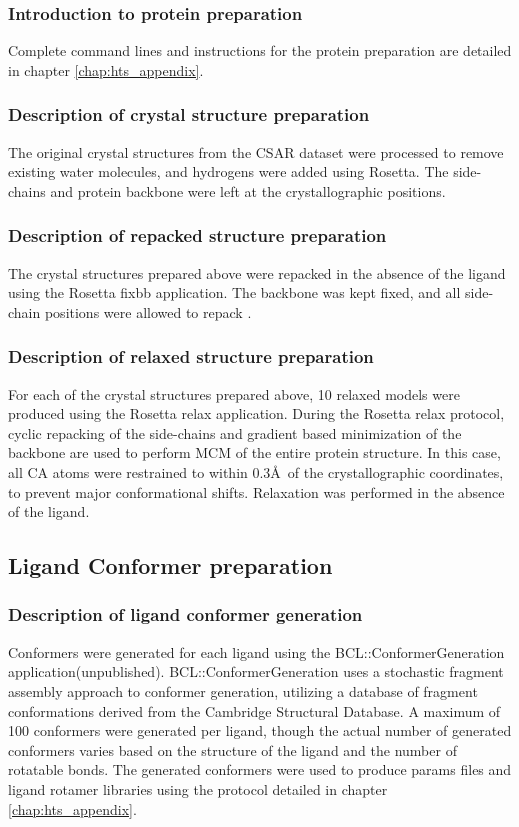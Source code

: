 \subsubsection{Introduction to protein preparation}
Complete command lines and instructions for the protein preparation are detailed in chapter \ref{chap:hts_appendix}.

\subsubsection{Description of crystal structure preparation}
The original crystal structures from the \ac{CSAR} dataset were processed to remove existing water molecules, and hydrogens were added using Rosetta.
The side-chains and protein backbone were left at the crystallographic positions.

\subsubsection{Description of repacked structure preparation}
The crystal structures prepared above were repacked in the absence of the ligand using the Rosetta fixbb application.
The backbone was kept fixed, and all side-chain positions were allowed to repack \citep{Kortemme:2004ia}.

\subsubsection{Description of relaxed structure preparation}
For each of the crystal structures prepared above, 10 relaxed models were produced using the Rosetta relax application.
During the Rosetta relax protocol, cyclic repacking of the side-chains and gradient based minimization of the backbone are used to perform \ac{MCM} of the entire protein structure.
In this case, all CA atoms were restrained to within 0.3\AA\ of the crystallographic coordinates, to prevent major conformational shifts.
Relaxation was performed in the absence of the ligand.

\subsection{Ligand Conformer preparation}
\subsubsection{Description of ligand conformer generation}

Conformers were generated for each ligand using the BCL::ConformerGeneration application(unpublished).
BCL::ConformerGeneration uses a stochastic fragment assembly approach to conformer generation, utilizing a database of fragment conformations derived from the Cambridge Structural Database. 
A maximum of 100 conformers were generated per ligand, though the actual number of generated conformers varies based on the structure of the ligand and the number of rotatable bonds. The generated conformers were used to produce params files and ligand rotamer libraries using the protocol detailed in chapter \ref{chap:hts_appendix}.
